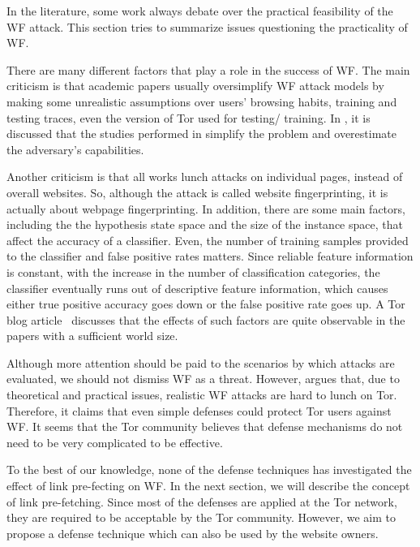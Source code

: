 In the literature, some work always debate over the practical feasibility of the WF attack. This section tries to summarize issues questioning the practicality of WF.

There are many different factors that play a role in the success of WF.
The main criticism is that academic papers usually oversimplify WF attack models by making some unrealistic assumptions over users' browsing habits, training and testing traces, even the version of Tor used for testing/ training.
In \cite{juarez14}, it is discussed that the studies performed in \cite{cai2012touching, herrmann2009, panchenko11, wang2013improved, shi2009} simplify the problem and overestimate the adversary's capabilities.

Another criticism is that all works lunch attacks on individual pages, instead of overall websites.
So, although the attack is called website fingerprinting, it is actually about webpage fingerprinting.
In addition, there are some main factors, including the the hypothesis state space and the size of the instance space, that affect the accuracy of a classifier.
Even, the number of training samples provided to the classifier and false positive rates matters.
Since reliable feature information is constant, with the increase in the number of classification categories, the classifier eventually runs out of descriptive feature information, which causes either true positive accuracy goes down or the false positive rate goes up.
A Tor blog article~\cite{TorBlog} discusses that the effects of such factors are quite observable in the papers with a sufficient world size.

Although more attention should be paid to the scenarios by which attacks are evaluated, we should not dismiss WF as a threat. However, \cite{TorBlog} argues that, due to theoretical and practical issues, realistic WF attacks are hard to lunch on Tor. Therefore, it claims that even simple defenses could protect Tor users against WF. It seems that the Tor community believes that defense mechanisms do not need to be very complicated to be effective.

To the best of our knowledge, none of the defense techniques has investigated the effect of link pre-fecting on WF. In the next section, we will describe the concept of link pre-fetching. Since most of the defenses are applied at the Tor network, they are required to be acceptable by the Tor community. However, we aim to propose a defense technique which can also be used by the website owners.



